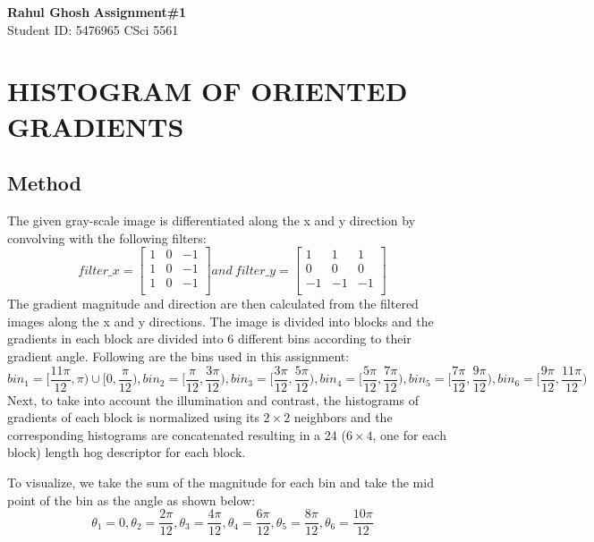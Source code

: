 \documentclass[letter, 11pt]{article}
\begin{document}
\noindent
\large \textbf{Rahul Ghosh} \hfill \textbf{Assignment\#1}\\
\normalsize Student ID: 5476965 \hfill CSci 5561\\

\section*{HISTOGRAM OF ORIENTED GRADIENTS}
\subsection*{Method}
The given gray-scale image is differentiated along the x and y direction by convolving with the following filters:
\begin{equation*}
    filter\_x = \begin{bmatrix}
    1 & 0 & -1\\
    1 & 0 & -1\\
    1 & 0 & -1\\
    \end{bmatrix}
    and\ filter\_y = \begin{bmatrix}
    1 & 1 & 1\\
    0 & 0 & 0\\
    -1 & -1 & -1\\
    \end{bmatrix}
\end{equation*}
The gradient magnitude and direction are then calculated from the filtered images along the x and y directions. The image is divided into blocks and the gradients in each block are divided into 6 different bins according to their gradient angle. Following are the bins used in this assignment:
\begin{equation*}
    bin_1 = [\frac{11\pi}{12}, \pi)\cup[0, \frac{\pi}{12}),
    bin_2 = [\frac{\pi}{12}, \frac{3\pi}{12}),
    bin_3 = [\frac{3\pi}{12}, \frac{5\pi}{12}),
    bin_4 = [\frac{5\pi}{12}, \frac{7\pi}{12}),
    bin_5 = [\frac{7\pi}{12}, \frac{9\pi}{12}),
    bin_6 = [\frac{9\pi}{12}, \frac{11\pi}{12})
\end{equation*}
Next, to take into account the illumination and contrast, the histograms of gradients of each block is normalized using its $2\times2$ neighbors and the corresponding histograms are concatenated resulting in a 24 ($6\times4$, one for each block) length hog descriptor for each block.

To visualize, we take the sum of the magnitude for each bin and take the mid point of the bin as the angle as shown below:
\begin{equation*}
    \theta_1 = 0, \theta_2 = \frac{2\pi}{12}, \theta_3 = \frac{4\pi}{12}, \theta_4 = \frac{6\pi}{12}, \theta_5 = \frac{8\pi}{12}, \theta_6 = \frac{10\pi}{12}
\end{equation*}
\end{document}
